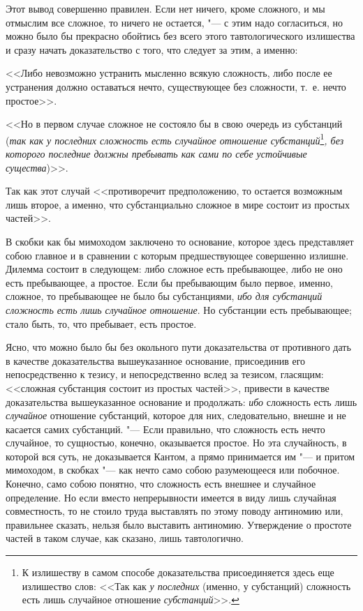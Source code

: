 Этот вывод совершенно правилен. Если нет ничего, кроме сложного, и мы
отмыслим все сложное, то ничего не остается, "--- с этим надо согласиться, но
можно было бы прекрасно обойтись без всего этого тавтологического излишества
и сразу начать доказательство с того, что следует за этим, а именно:

<<Либо невозможно устранить мысленно всякую сложность, либо после ее
устранения должно оставаться нечто, существующее без сложности, т.~е. нечто
простое>>.

<<Но в первом случае сложное не состояло бы в свою очередь из субстанций
({\em так как у последних сложность есть случайное
отношение субстанций}\footnote{К излишеству в самом способе
доказательства присоединяется здесь еще излишество слов: <<Так как
{\em у последних} (именно, у субстанций) сложность есть лишь случайное
отношение {\em субстанций}>>.}{\em , без которого последние должны
пребывать как сами по себе устойчивые существа})>>.

Так как этот случай <<противоречит предположению, то остается возможным лишь
второе, а именно, что субстанциально сложное в мире состоит из простых
частей>>.

В скобки как бы мимоходом заключено то основание, которое здесь представляет
собою главное и в сравнении с которым предшествующее совершенно излишне.
Дилемма состоит в следующем: либо сложное есть пребывающее, либо не оно
есть пребывающее, а простое. Если бы пребывающим было первое, именно,
сложное, то пребывающее не было бы субстанциями, {\em ибо для субстанций
сложность есть лишь случайное отношение}. Но субстанции есть пребывающее;
стало быть, то, что пребывает, есть простое.

Ясно, что можно было бы без окольного пути доказательства от противного дать
в качестве доказательства вышеуказанное основание, присоединив его
непосредственно к тезису, и непосредственно вслед за тезисом, гласящим:
<<сложная субстанция состоит из простых частей>>, привести в качестве
доказательства вышеуказанное основание и продолжать:
{\em ибо} сложность есть лишь
{\em случайное} отношение субстанций, которое для них,
следовательно, внешне и не касается самих субстанций. "--- Если правильно, что
сложность есть нечто случайное, то сущностью, конечно, оказывается простое.
Но эта случайность, в которой вся суть, не доказывается Кантом, а прямо
принимается им "--- и притом мимоходом, в скобках "--- как нечто само собою
разумеющееся или побочное. Конечно, само собою понятно, что сложность есть
внешнее и случайное определение. Но если вместо непрерывности имеется в
виду лишь случайная совместность, то не стоило труда выставлять по этому
поводу антиномию или, правильнее сказать, нельзя было выставить антиномию.
Утверждение о простоте частей в таком случае, как сказано, лишь
тавтологично.

